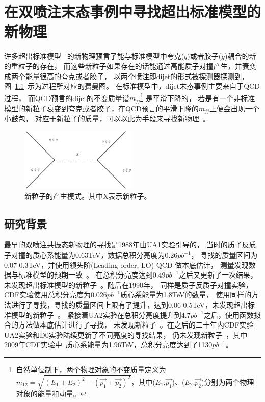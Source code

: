 
\chapter{在双喷注末态事例中寻找超出标准模型的新物理}
\label{cha:Dijet}



许多超出标准模型~\cite{qstar1,qstar2,zprime1,zprime3,wprime1,Chizhov:2009fc,Chizhov:2010jg,DM1,DM2,DM3,qbh1,qbh2,RS1,RS2}
的新物理预言了能与标准模型中夸克($q$)或者胶子($g$)耦合的新的重粒子的存在，
而这些新粒子如果存在的话能通过高能质子对撞产生，并衰变成两个能量很高的夸克或者胶子，
以两个喷注即dijet的形式被探测器探测到，图~\ref{fig:Dijet1}~示为过程所对应的费曼图。
在标准模型中，dijet末态事例主要来自于QCD过程，
而QCD预言的dijet的不变质量谱$m_{jj}
$\footnote{自然单位制下，两个物理对象的不变质量定义为$m_{12}=\sqrt{(E_1+E_2)^2-(\vec{p_1}+\vec{p_2})^2}$，其中($E_1$,$\vec{p_1}$)、($E_2$,$\vec{p_2}$)分别为两个物理对象的能量和动量。}
是平滑下降的，
若是有一个非标准模型的新粒子衰变到夸克或者胶子，在QCD预言的平滑下降的$m_{jj}$上便会出现一个小鼓包，
对应于新粒子的质量，可以以此为手段来寻找新物理~\cite{UA3}。

\begin{figure}
  \begin{center}
    \includegraphics[width=0.5\textwidth]{figuresTHE/SChl.pdf}
  \end{center}
  \caption{
新粒子的产生模式。其中X表示新粒子。
}
    \label{fig:Dijet1}
\end{figure}


\section{研究背景}
\label{sec:DijetBKG}


最早的双喷注共振态新物理的寻找是1988年由UA1实验引导的，
当时的质子反质子对撞的质心系能量为0.63TeV，数据总积分亮度为0.26$pb^{-1}$，
寻找的质量区间为0.07-0.3TeV，并使用领头阶(Leading order, LO) QCD 做本底估计，
测量发现数据与标准模型的预期一致~\cite{UA1}。
在总积分亮度达到0.49$pb^{-1}$之后又更新了一次结果，
未发现超出标准模型的新粒子~\cite{UA2}。随后在1990年，
同样是质子反质子对撞实验，CDF实验使用总积分亮度为0.026$pb^{-1}$质心系能量为1.8TeV的数量，
使用同样的方法进行了寻找，寻找的质量区间上限有了提升，达到0.06-0.5TeV，未发现超出标准模型的新粒子~\cite{CDF1}。
紧接着UA2实验在总积分亮度提升到4.7$pb^{-1}$之后，使用函数拟合的方法做本底估计进行了寻找，
未发现新粒子~\cite{UA3}。在之后的二十年内CDF实验UA2实验和D0实验陆续更新了不同亮度的寻找结果，
仍未发现新粒子~\cite{CDF2,UA4,CDF3,CDF4,D01,CDF5}，其中2009年CDF实验中~\cite{CDF5}质心系能量为1.96TeV，总积分亮度达到了1130$pb^{-1}$。

